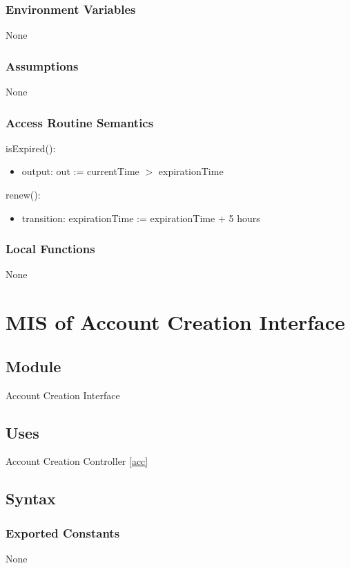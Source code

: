 \documentclass[12pt, titlepage]{article}
\begin{document}
\subsubsection{Environment Variables}
None

\subsubsection{Assumptions}
None

\subsubsection{Access Routine Semantics}

\noindent isExpired():
\begin{itemize}
\item output: out := currentTime $>$ expirationTime
\end{itemize}

\noindent renew():
\begin{itemize}
\item transition: expirationTime := expirationTime + 5 hours
\end{itemize}

\subsubsection{Local Functions}
None

\section{MIS of Account Creation Interface} \label{aci}

\subsection{Module}

Account Creation Interface

\subsection{Uses}

Account Creation Controller \ref{acc}

\subsection{Syntax}

\subsubsection{Exported Constants}
None
\end{document}
